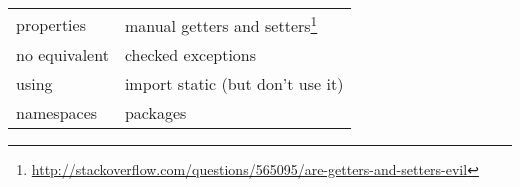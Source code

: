 \begin{tabular}{ll}
properties & manual getters and setters\footnote{\url{http://stackoverflow.com/questions/565095/are-getters-and-setters-evil}} \\
no equivalent & checked exceptions \\

using & import static (but don't use it) \\
namespaces & packages \\

\end{tabular}





